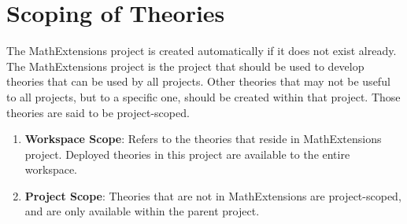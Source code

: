 \section{Scoping of Theories}
The MathExtensions project is created automatically if it does not exist already. The MathExtensions project is the project that should be used to develop theories that can be used by all projects. Other theories that may not be useful to all projects, but to a specific one, should be created within that project. Those theories are said to be project-scoped.
\begin{enumerate}
	\item \textbf{Workspace Scope}: Refers to the theories that reside in MathExtensions project. Deployed theories in this project are available to the entire workspace.
	\item  \textbf{Project Scope}: Theories that are not in MathExtensions are project-scoped, and are only available within the parent project.
\end{enumerate}

